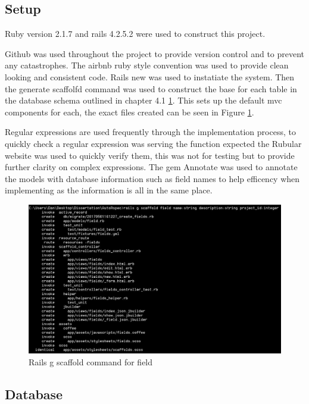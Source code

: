 \documentclass[a4paper,12pt]{article}
\begin{document}
\subsection{Setup}
\par Ruby version 2.1.7 and rails 4.2.5.2 were used to construct this project.
\par Github\cite{github} was used throughout the project to provide version control and to prevent any catastrophes. The airbnb ruby style convention was used to provide clean looking and consistent code\cite{Airbnb}. Rails new was used to instatiate the system. Then the generate scaffolfd command was used to construct the base for each table in the database schema outlined in chapter 4.1 \ref{fig:scaffold}. This sets up the default mvc components for each, the exact files created can be seen in Figure \ref{fig:scaffold}. 
\par Regular expressions are used frequently through the implementation process, to quickly check a regular expression was serving the function expected the Rubular\cite{rubular} website was used to quickly verify them, this was not for testing but to provide further clarity on complex expressions. The gem Annotate\cite{annotate} was used to annotate the models with database information such as field names to help efficency when implementing as the information is all in the same place.

\begin{figure}
\includegraphics[width=\linewidth]{screenshots/scaffold_example}
\caption{Rails g scaffold command for field}
\label{fig:scaffold}
\end{figure}

\subsection{Database}
\end{document}
